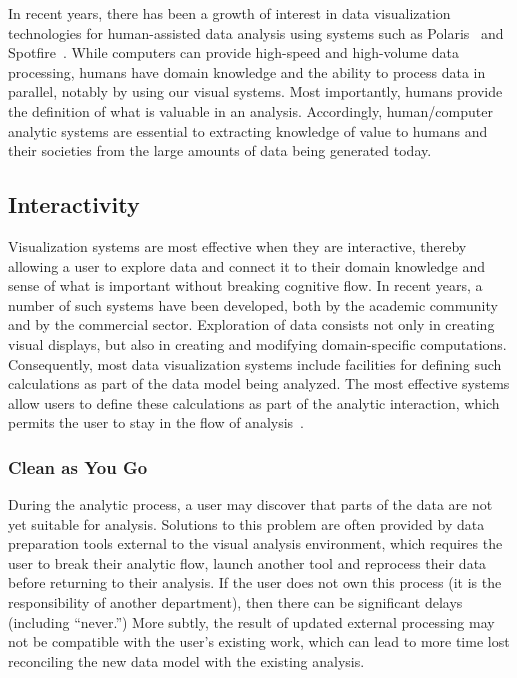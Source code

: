 In recent years, there has been a growth of interest in data visualization technologies for human-assisted data analysis using systems such as Polaris~\cite{Stolte:2008} and Spotfire~\cite{Ahlberg:1996}. While computers can provide high-speed and high-volume data processing, humans have domain knowledge and the ability to process data in parallel, notably by using our visual systems. Most importantly, humans provide the definition of what is valuable in an analysis. Accordingly, human/computer analytic systems are essential to extracting knowledge of value to humans and their societies from the large amounts of data being generated today.


\subsection{Interactivity}
Visualization systems are most effective when they are interactive, thereby allowing a user to explore data and connect it to their domain knowledge and sense of what is important without breaking cognitive flow. In recent years, a number of such systems have been developed, both by the academic community and by the commercial sector. Exploration of data consists not only in creating visual displays, but also in creating and modifying domain-specific computations. Consequently, most data visualization systems include facilities for defining such calculations as part of the data model being analyzed. The most effective systems allow users to define these calculations as part of the analytic interaction, which permits the user to stay in the flow of analysis~\cite{Morton:2012}.

\subsubsection{Clean as You Go}
During the analytic process, a user may discover that parts of the data are not yet suitable for analysis. Solutions to this problem are often provided by data preparation tools external to the visual analysis environment, which requires the user to break their analytic flow, launch another tool and reprocess their data before returning to their analysis. If the user does not own this process (\eg it is the responsibility of another department), then there can be significant delays (including ``never.'') More subtly, the result of updated external processing may not be compatible with the user's existing work, which can lead to more time lost reconciling the new data model with the existing analysis.

